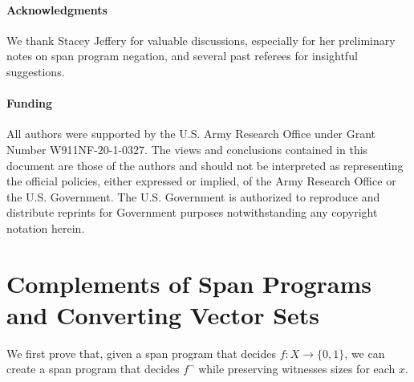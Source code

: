 \documentclass[cleveref, autoref, thm-restate,11pt]{article}
\theoremstyle{definition}
\begin{document}


 

\paragraph{Acknowledgments}
We thank Stacey Jeffery for valuable discussions, especially for her preliminary notes on span program negation, and several past referees for insightful suggestions.

\paragraph{Funding}
All authors were supported by the U.S. Army Research Office 
under Grant Number W911NF-20-1-0327. The views and conclusions contained in
this document are those of the authors and should not be interpreted as
representing the official policies, either expressed or implied, of the Army
Research Office or the U.S. Government. The U.S. Government is authorized to
reproduce and distribute reprints for Government purposes notwithstanding any
copyright notation herein.













\appendix
\section{Complements of Span Programs and Converting Vector Sets}\label{app:sec2}

We first prove that, given a span program that decides $f:X\rightarrow\{0,1\}$,
we can create a span program that decides $f^{\neg }$ while preserving witnesses
sizes for each $x$.

\SPduals*
\end{document}
